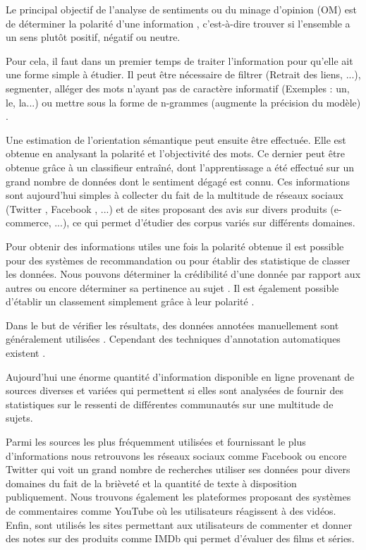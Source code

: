 \documentclass[8pt]{article}
\begin{document}
\begin{multicols}{2}
\par Le principal objectif de l’analyse de sentiments ou du minage d’opinion (OM) est de déterminer la polarité d’une information \cite{ressource6}, c’est-à-dire trouver si l’ensemble a un sens plutôt positif, négatif ou neutre.
\par Pour cela, il faut dans un premier temps de traiter l’information pour qu’elle ait une forme simple à étudier. Il peut être nécessaire de filtrer (Retrait des liens, ...), segmenter, alléger des mots n’ayant pas de caractère informatif (Exemples : un, le, la...) ou mettre sous la forme de n-grammes (augmente la précision du modèle) \cite{ressource10}.
\par Une estimation de l’orientation sémantique peut ensuite être effectuée. Elle est obtenue en analysant la polarité et l’objectivité des mots. Ce dernier peut être obtenue grâce à un classifieur entraîné, dont l’apprentissage a été effectué sur un grand nombre de données dont le sentiment dégagé est connu. Ces informations sont aujourd’hui  simples à collecter \cite{ressource10} du fait de la multitude de réseaux sociaux (Twitter \cite{ressource11}, Facebook \cite{ressource27}, ...) et de sites proposant des avis sur divers produits (e-commerce, ...), ce qui permet d’étudier des corpus variés sur différents domaines.
\par Pour obtenir des informations utiles une fois la polarité obtenue il est possible pour des systèmes de recommandation ou pour établir des statistique de classer les données. Nous pouvons déterminer la crédibilité d’une donnée par rapport aux autres \cite{ressource28} ou encore déterminer sa pertinence au sujet \cite{ressource18}. Il est également possible d’établir un classement  simplement grâce à leur polarité \cite{ressource4}.
\par Dans le but de vérifier les résultats, des données annotées manuellement sont généralement utilisées \cite{ressource30}. Cependant des techniques d’annotation automatiques existent \cite{ressource19}.

\par Aujourd'hui une énorme quantité d’information disponible en ligne provenant de sources diverses et variées qui permettent si elles sont analysées de fournir des statistiques sur le ressenti de différentes communautés sur une multitude de sujets.
\par Parmi les sources les plus fréquemment utilisées et fournissant le plus d’informations nous retrouvons les réseaux sociaux comme Facebook \cite{ressource27} ou encore Twitter \cite{ressource10} \cite{ressource11} \cite{ressource14} \cite{ressource17} \cite{ressource19} \cite{ressource22} \cite{ressource23} \cite{ressource24} \cite{ressource28} qui voit un grand nombre de recherches utiliser ses données pour divers domaines du fait de la brièveté et la quantité de texte à disposition publiquement. Nous trouvons également les plateformes proposant des systèmes de commentaires comme YouTube \cite{ressource30} \cite{ressource22} où les utilisateurs réagissent à des vidéos. Enfin, sont utilisés les sites permettant aux utilisateurs de commenter et donner des notes sur des produits comme IMDb \cite{ressource1} qui permet d’évaluer des films et séries.



\end{multicols}
\end{document}
